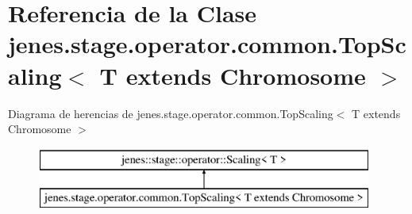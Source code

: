 \hypertarget{classjenes_1_1stage_1_1operator_1_1common_1_1_top_scaling_3_01_t_01extends_01_chromosome_01_4}{\section{Referencia de la Clase jenes.\-stage.\-operator.\-common.\-Top\-Scaling$<$ T extends Chromosome $>$}
\label{classjenes_1_1stage_1_1operator_1_1common_1_1_top_scaling_3_01_t_01extends_01_chromosome_01_4}
}
Diagrama de herencias de jenes.\-stage.\-operator.\-common.\-Top\-Scaling$<$ T extends Chromosome $>$\begin{figure}[H]
\begin{center}
\leavevmode
\includegraphics[height=2.000000cm]{classjenes_1_1stage_1_1operator_1_1common_1_1_top_scaling_3_01_t_01extends_01_chromosome_01_4}
\end{center}
\end{figure}
